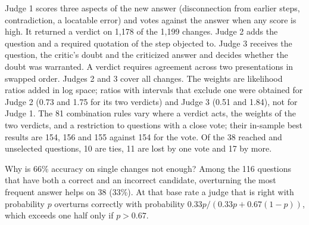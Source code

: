 \documentclass[11pt]{article}
\begin{document}
Judge 1 scores three aspects of the new answer (disconnection from earlier steps, contradiction, a locatable error) and votes against the answer when any score is high. It returned a verdict on 1{,}178 of the 1{,}199 changes.
Judge 2 adds the question and a required quotation of the step objected to.
Judge 3 receives the question, the critic's doubt and the criticized answer and decides whether the doubt was warranted. A verdict requires agreement across two presentations in swapped order.
Judges 2 and 3 cover all changes.
The weights are likelihood ratios added in log space; ratios with intervals that exclude one were obtained for Judge 2 (0.73 and 1.75 for its two verdicts) and Judge 3 (0.51 and 1.84), not for Judge 1.
The 81 combination rules vary where a verdict acts, the weights of the two verdicts, and a restriction to questions with a close vote; their in-sample best results are 154, 156 and 155 against 154 for the vote.
Of the 38 reached and unselected questions, 10 are ties, 11 are lost by one vote and 17 by more.

Why is 66\% accuracy on single changes not enough?
Among the 116 questions that have both a correct and an incorrect candidate, overturning the most frequent answer helps on 38 (33\%).
At that base rate a judge that is right with probability $p$ overturns correctly with probability $0.33p/(0.33p+0.67(1-p))$, which exceeds one half only if $p>0.67$.
\end{document}
